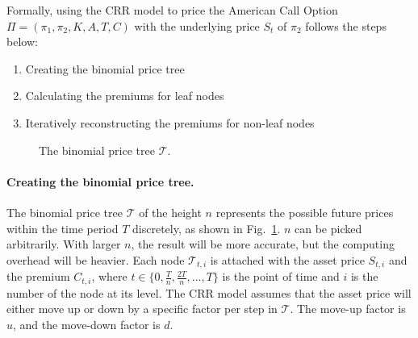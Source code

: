 Formally, using the CRR model to price the American Call Option $\Pi = (\pi_1, \pi_2, K, A, T, C)$ with the underlying price $S_t$ of $\pi_2$ follows the steps below:
\begin{enumerate}
    \item Creating the binomial price tree
    \item Calculating the premiums for leaf nodes
    \item Iteratively reconstructing the premiums for non-leaf nodes 
\end{enumerate}

\begin{figure}
\centering
{}
\caption{The binomial price tree $\mathcal{T}$.}
\label{fig:binomial_tree}
\end{figure}


\paragraph{Creating the binomial price tree.}
The binomial price tree $\mathcal{T}$ of the height $n$ represents the possible future prices within the time period $T$ discretely, as shown in Fig.~\ref{fig:binomial_tree}.
$n$ can be picked arbitrarily. With larger $n$, the result will be more accurate, but the computing overhead will be heavier.
Each node $\mathcal{T}_{t, i}$ is attached with the asset price $S_{t, i}$ and the premium $C_{t, i}$,
where $t \in \{0, \frac{T}{n}, \frac{2T}{n}, \dots, T\}$ is the point of time and $i$ is the number of the node at its level.
The CRR model assumes that the asset price will either move up or down by a specific factor per step in $\mathcal{T}$.
The move-up factor is $u$, and the move-down factor is $d$.

